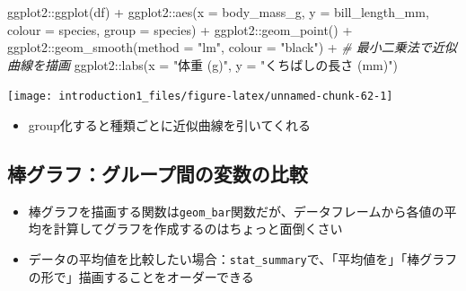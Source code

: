 \documentclass[
]{ltjsarticle}
\newenvironment{Shaded}{\begin{snugshade}}{\end{snugshade}}
\newcommand{\AttributeTok}[1]{\textcolor[rgb]{0.77,0.63,0.00}{#1}}
\newcommand{\CommentTok}[1]{\textcolor[rgb]{0.56,0.35,0.01}{\textit{#1}}}
\newcommand{\FunctionTok}[1]{\textcolor[rgb]{0.00,0.00,0.00}{#1}}
\newcommand{\NormalTok}[1]{#1}
\newcommand{\SpecialCharTok}[1]{\textcolor[rgb]{0.00,0.00,0.00}{#1}}
\newcommand{\StringTok}[1]{\textcolor[rgb]{0.31,0.60,0.02}{#1}}
\providecommand{\tightlist}{%
  \setlength{\itemsep}{0pt}\setlength{\parskip}{0pt}}
\begin{document}
\begin{Shaded}
\begin{Highlighting}[]
\NormalTok{ggplot2}\SpecialCharTok{::}\FunctionTok{ggplot}\NormalTok{(df) }\SpecialCharTok{+}
\NormalTok{  ggplot2}\SpecialCharTok{::}\FunctionTok{aes}\NormalTok{(}\AttributeTok{x =}\NormalTok{ body\_mass\_g, }\AttributeTok{y =}\NormalTok{ bill\_length\_mm, }\AttributeTok{colour =}\NormalTok{ species, }\AttributeTok{group =}\NormalTok{ species) }\SpecialCharTok{+}
\NormalTok{  ggplot2}\SpecialCharTok{::}\FunctionTok{geom\_point}\NormalTok{() }\SpecialCharTok{+}
\NormalTok{  ggplot2}\SpecialCharTok{::}\FunctionTok{geom\_smooth}\NormalTok{(}\AttributeTok{method =} \StringTok{"lm"}\NormalTok{, }\AttributeTok{colour =} \StringTok{"black"}\NormalTok{) }\SpecialCharTok{+} \CommentTok{\# 最小二乗法で近似曲線を描画}
\NormalTok{  ggplot2}\SpecialCharTok{::}\FunctionTok{labs}\NormalTok{(}\AttributeTok{x =} \StringTok{"体重 (g)"}\NormalTok{, }\AttributeTok{y =} \StringTok{"くちばしの長さ (mm)"}\NormalTok{)}
\end{Highlighting}
\end{Shaded}

\begin{center}\texttt{[image: introduction1\_files/figure-latex/unnamed-chunk-62-1]} \end{center}

\begin{itemize}
\tightlist
\item
  group化すると種類ごとに近似曲線を引いてくれる
\end{itemize}

\hypertarget{ux68d2ux30b0ux30e9ux30d5ux30b0ux30ebux30fcux30d7ux9593ux306eux5909ux6570ux306eux6bd4ux8f03}{%
\subsection{棒グラフ：グループ間の変数の比較}\label{ux68d2ux30b0ux30e9ux30d5ux30b0ux30ebux30fcux30d7ux9593ux306eux5909ux6570ux306eux6bd4ux8f03}}

\begin{itemize}
\tightlist
\item
  棒グラフを描画する関数は\texttt{geom\_bar}関数だが、データフレームから各値の平均を計算してグラフを作成するのはちょっと面倒くさい
\item
  データの平均値を比較したい場合：\texttt{stat\_summary}で、「平均値を」「棒グラフの形で」描画することをオーダーできる
\end{itemize}
\end{document}
